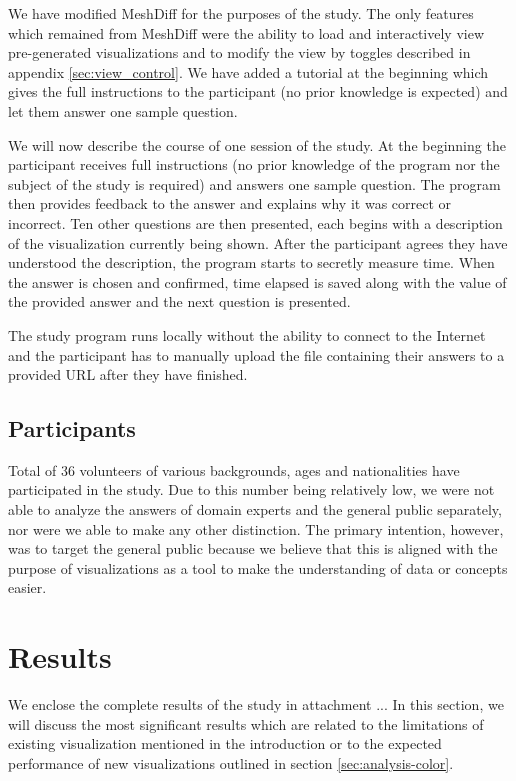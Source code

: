 We have modified MeshDiff for the purposes of the study. The only features which remained from MeshDiff were the ability to load and interactively view pre-generated visualizations and to modify the view by toggles described in appendix \ref{sec:view_control}. We have added a tutorial at the beginning which gives the full instructions to the participant (no prior knowledge is expected) and let them answer one sample question. 

We will now describe the course of one session of the study. At the beginning the participant receives full instructions (no prior knowledge of the program nor the subject of the study is required) and answers one sample question. The program then provides feedback to the answer and explains why it was correct or incorrect. Ten other questions are then presented, each begins with a description of the visualization currently being shown. After the participant agrees they have understood the description, the program starts to secretly measure time. When the answer is chosen and confirmed, time elapsed is saved along with the value of the provided answer and the next question is presented.

The study program runs locally without the ability to connect to the Internet and the participant has to manually upload the file containing their answers to a provided URL after they have finished.

\subsection{Participants}

Total of 36 volunteers of various backgrounds, ages and nationalities have participated in the study. Due to this number being relatively low, we were not able to analyze the answers of domain experts and the general public separately, nor were we able to make any other distinction. The primary intention, however, was to target the general public because we believe that this is aligned with the purpose of visualizations as a tool to make the understanding of data or concepts easier.

\section{Results}

We enclose the complete results of the study in attachment ... In this section, we will discuss the most significant results which are related to the limitations of existing visualization mentioned in the introduction or to the expected performance of new visualizations outlined in section \ref{sec:analysis-color}.

